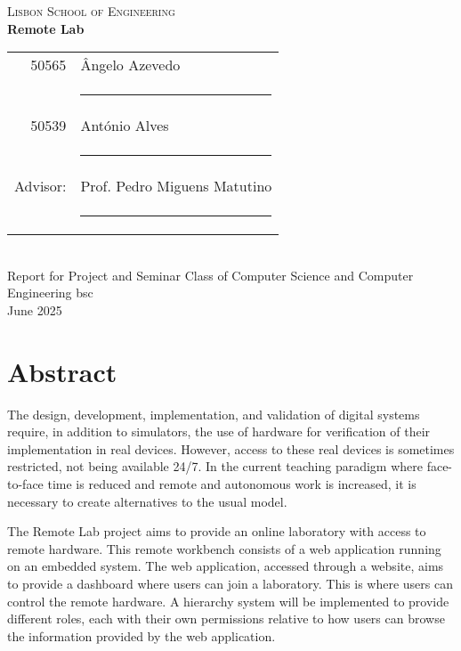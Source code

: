 \documentclass[a4paper,openright,twoside,11pt]{report}
\begin{document}
\cleardoublepage
\begin{center}
\textsc{\LARGE Lisbon School of Engineering}\\[15mm]

{\Large \bf  Remote Lab}\\[20mm]

\begin{tabular}{rl}
  50565  & Ângelo Azevedo\\[10mm]
           & \rule{75mm}{0.5pt}\\[5mm]

  50539  & António Alves\\[10mm]
           & \rule{75mm}{0.5pt}\\[5mm]

  Advisor: & Prof. Pedro Miguens Matutino\\[10mm]
      & \rule{75mm}{0.5pt}\\[5mm]
\end{tabular}\\[5cm]
{\large Report for Project and Seminar Class of Computer Science and Computer Engineering \acs{bsc}\\[3cm]}
June 2025\\
\end{center}

\cleardoublepage
\chapter*{Abstract}
The design, development, implementation, and validation of digital systems require, in addition 
to simulators, the use of hardware for verification of their implementation in real devices. 
However, access to these real devices is sometimes restricted, not being available 24/7. 
In the current teaching paradigm where face-to-face time is reduced and remote and autonomous work 
is increased, it is necessary to create alternatives to the usual model.

The Remote Lab project aims to provide an online laboratory with access to remote hardware.
This remote workbench consists of a web application running on an embedded system. The web application, accessed through a website, 
aims to provide a dashboard where users can join a laboratory. This
is where users can control the remote hardware. A hierarchy system will be implemented to
provide different roles, each with their own permissions relative to how users can browse the
information provided by the web application.
\end{document}
